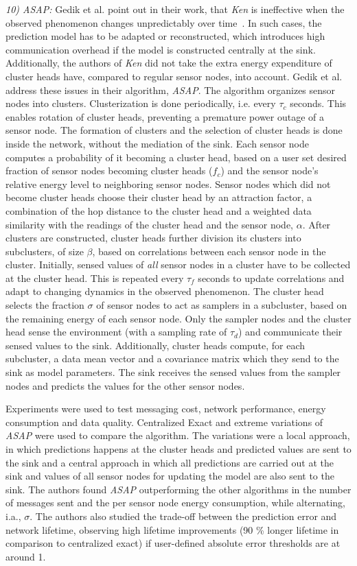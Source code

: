 \par
\textit{10) ASAP:}
Gedik et al. point out in their work, that \textit{Ken} is ineffective when the
observed phenomenon changes unpredictably over time~\cite{gedik2007asap}. In
such cases, the prediction model has to be adapted or reconstructed, which
introduces high communication overhead if the model is constructed centrally at
the sink. Additionally, the authors of \textit{Ken} did not take the extra
energy expenditure of cluster heads have, compared to regular sensor nodes,
into account. Gedik et al. address these issues in their algorithm,
\textit{ASAP}. The algorithm organizes sensor nodes into clusters.
Clusterization is done periodically, i.e. every $ \tau_c $ seconds. This
enables rotation of cluster heads, preventing a premature power outage of a
sensor node. The formation of clusters and the selection of cluster heads is
done inside the network, without the mediation of the sink. Each sensor node
computes a probability of it becoming a cluster head, based on a user set
desired fraction of sensor nodes becoming cluster heads ($ f_c $) and the
sensor node's relative energy level to neighboring sensor nodes. Sensor nodes
which did not become cluster heads choose their cluster head by an attraction
factor, a combination of the hop distance to the cluster head and a weighted
data similarity with the readings of the cluster head and the sensor node, $
\alpha $. After clusters are constructed, cluster heads further division its
clusters into subclusters, of size $ \beta $, based on correlations between
each sensor node in the cluster. Initially, sensed values of \textit{all}
sensor nodes in a cluster have to be collected at the cluster head. This is
repeated every $ \tau_f $ seconds to update correlations and adapt to changing
dynamics in the observed phenomenon. The cluster head selects the fraction $
\sigma $ of sensor nodes to act as samplers in a subcluster, based on the
remaining energy of each sensor node. Only the sampler nodes and the cluster
head sense the environment (with a sampling rate of $ \tau_d $) and communicate
their sensed values to the sink. Additionally, cluster heads compute, for each
subcluster, a data mean vector and a covariance matrix which they send to the
sink as model parameters. The sink receives the sensed values from the sampler
nodes and predicts the values for the other sensor nodes.

Experiments were used to test messaging cost, network performance, energy
consumption and data quality. Centralized Exact and extreme variations of
\textit{ASAP} were used to compare the algorithm. The variations were a local
approach, in which predictions happens at the cluster heads and predicted
values are sent to the sink and a central approach in which all
predictions are carried out at the sink and values of all sensor nodes
for updating the model are also sent to the sink. The authors found
\textit{ASAP} outperforming the other algorithms in the number of messages sent
and the per sensor node energy consumption, while alternating, i.a., $ \sigma
$. The authors also studied the trade-off between the prediction error and
network lifetime, observing high lifetime improvements (90 \% longer lifetime in
comparison to centralized exact) if user-defined absolute error thresholds are
at around 1.

